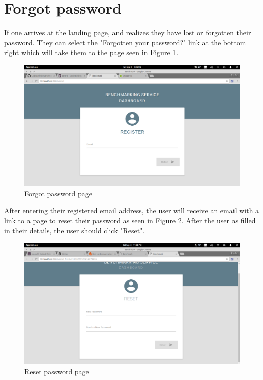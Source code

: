 \documentclass[11pt,a4paper]{article}
\begin{document}
\section{Forgot password}
If one arrives at the landing page, and realizes they have lost or forgotten their password. They can select the
"Forgotten your password?" link at the bottom right which will take them to the page seen in Figure \ref{fig:forgotPage}.
\begin{figure}[H]
	\begin{center}
		\includegraphics[scale=0.3]{../Images/User Manual/Forgot Page.png}
		\caption{Forgot password page}
		\label{fig:forgotPage}
	\end{center}  
\end{figure}
\clearpage After entering their registered email address, the user will receive an email with a link to a page to reset their password
as seen in Figure \ref{fig:resetPage}. After the user as filled in their details, the user should click "Reset".
\begin{figure}[H]
	\begin{center}
		\includegraphics[scale=0.3]{../Images/User Manual/Reset Page.png}
		\caption{Reset password page}
		\label{fig:resetPage}
	\end{center}  
\end{figure}
\end{document}
